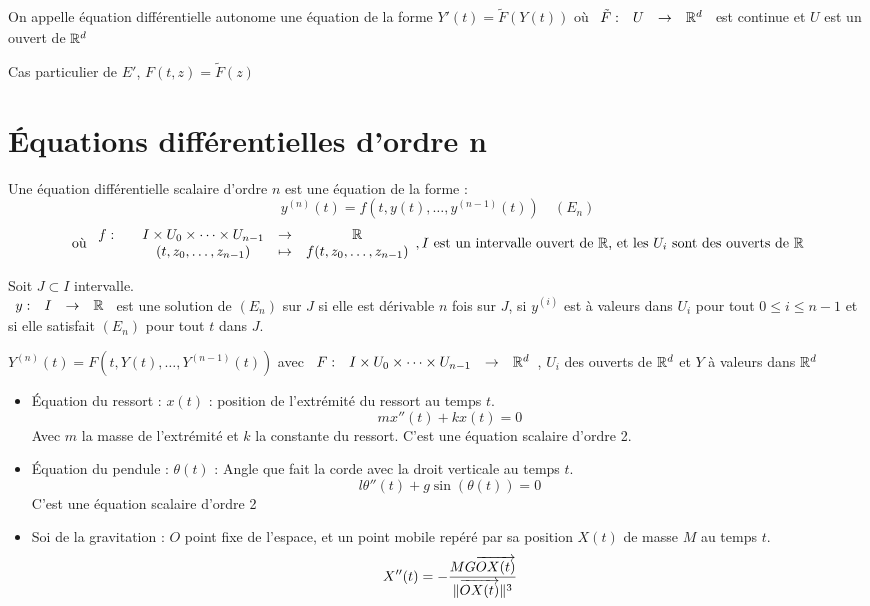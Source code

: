 \documentclass[]{report}
\begin{document}
\begin{df}
    On appelle équation différentielle autonome une équation de la forme $Y'(t)=\tilde{F}(Y(t))$ où $\begin{array}{ccccc} \tilde{F} : & U & \to & \mathbb{R}^d \end{array}$ est continue et $U$ est un ouvert de $\mathbb{R}^d$
\end{df}

\begin{re}
    Cas particulier de $E'$, $F(t,z)=\tilde{F}(z)$
\end{re}

\section{Équations différentielles d'ordre n}

Une équation différentielle scalaire d'ordre $n$ est une équation de la forme :
$$y^{(n)}(t)=f(t,y(t),\dots,y^{(n-1)}(t))\quad (E_n)$$
$$\text{où }\begin{array}{ccccc} f : & & I\times U_0\times\dots\times U_{n-1} & \to & \mathbb{R} \\ & & (t,z_0,\dots,z_{n-1}) & \mapsto & f(t,z_0,\dots,z_{n-1}) \end{array},I\text{ est un intervalle ouvert de }\mathbb{R} \text{, et les } U_i\text{ sont des ouverts de }\mathbb{R}$$

\begin{df}
    Soit $J\subset I$ intervalle.\\
    $\begin{array}{ccccc} y : & I & \to & \mathbb{R} \end{array}$ est une solution de $(E_n)$ sur $J$ si elle est dérivable $n$ fois sur $J$, si $y^{(i)}$ est à valeurs dans $U_i$ pour tout $0\le i\le n-1$ et si elle satisfait $(E_n)$ pour tout $t$ dans $J$.
\end{df}

\begin{df}
    $Y^{(n)}(t)=F(t,Y(t),\dots,Y^{(n-1)}(t))$ avec $\begin{array}{ccccc} F : & I\times U_0\times \dots\times U_{n-1} & \to & \mathbb{R}^d \end{array}$, $U_i$ des ouverts de $\mathbb{R}^d$ et $Y$ à valeurs dans $\mathbb{R}^d$
\end{df}

\begin{ex}
    \begin{itemize}
        \item Équation du ressort :
        $x(t)$ : position de l’extrémité  du ressort au temps $t$. $$mx''(t)+kx(t)=0$$ 
        Avec $m$ la masse de l’extrémité et $k$ la constante du ressort. C'est une équation scalaire d'ordre 2.
        \item Équation du pendule :
        $\theta(t)$ : Angle que fait la corde avec la droit verticale au temps $t$.$$l\theta''(t)+g\sin(\theta(t))=0$$
        C'est une équation scalaire d'ordre 2
        \item Soi de la gravitation :
        $O$ point fixe de l'espace, et un point mobile repéré par sa position $X(t)$ de masse $M$ au temps $t$.$$X''(t)=-\frac{MG\overrightarrow{OX(t)}}{\lVert \overrightarrow{OX(t)} \rVert^3}$$
    \end{itemize}
\end{ex}
\end{document}
